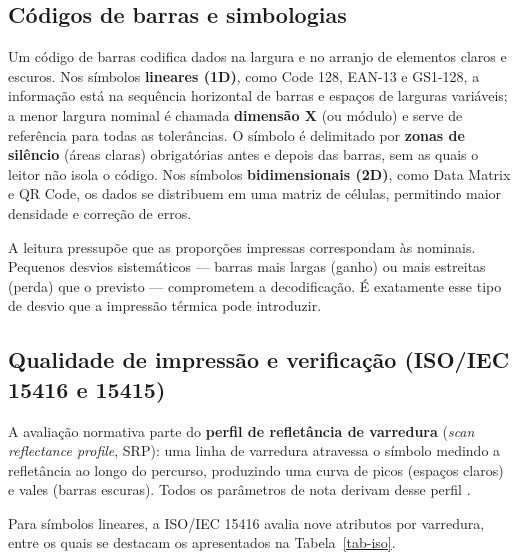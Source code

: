 \documentclass[
	article,			%
	11pt,				%
	oneside,			%
	a4paper,			%
	english,			%
	brazilian,			%
	sumario=tradicional
	]{abntex2}
\begin{document}
\subsection{Códigos de barras e simbologias}

Um código de barras codifica dados na largura e no arranjo de elementos claros e
escuros. Nos símbolos \textbf{lineares (1D)}, como Code 128, EAN-13 e GS1-128, a
informação está na sequência horizontal de barras e espaços de larguras
variáveis; a menor largura nominal é chamada \textbf{dimensão X} (ou módulo) e
serve de referência para todas as tolerâncias. O símbolo é delimitado por
\textbf{zonas de silêncio} (áreas claras) obrigatórias antes e depois das barras,
sem as quais o leitor não isola o código. Nos símbolos \textbf{bidimensionais
(2D)}, como Data Matrix e QR Code, os dados se distribuem em uma matriz de
células, permitindo maior densidade e correção de erros.

A leitura pressupõe que as proporções impressas correspondam às nominais. Pequenos
desvios sistemáticos --- barras mais largas (ganho) ou mais estreitas (perda) que
o previsto --- comprometem a decodificação. É exatamente esse tipo de desvio que a
impressão térmica pode introduzir.

\subsection{Qualidade de impressão e verificação (ISO/IEC 15416 e 15415)}
\label{sec-qualidade}

A avaliação normativa parte do \textbf{perfil de refletância de varredura}
(\textit{scan reflectance profile}, SRP): uma linha de varredura atravessa o
símbolo medindo a refletância ao longo do percurso, produzindo uma curva de picos
(espaços claros) e vales (barras escuras). Todos os parâmetros de nota derivam
desse perfil \cite{iso15416}.

Para símbolos lineares, a ISO/IEC 15416 avalia nove atributos por varredura, entre
os quais se destacam os apresentados na Tabela~\ref{tab-iso}.
\end{document}
